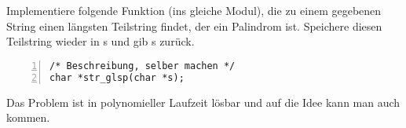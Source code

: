 \begin{aufg}
Implementiere folgende Funktion (ins gleiche Modul), die zu einem gegebenen String einen längsten Teilstring findet, der ein Palindrom ist. Speichere diesen Teilstring wieder in s und gib s zurück.
\begin{codelisting}
\begin{lstlisting}[numbers=left,numberstyle=\tiny,frame=tlrb]
/* Beschreibung, selber machen */
char *str_glsp(char *s);
\end{lstlisting}
\end{codelisting}
Das Problem ist in polynomieller Laufzeit lösbar und auf die Idee kann man auch kommen. 
\end{aufg}
